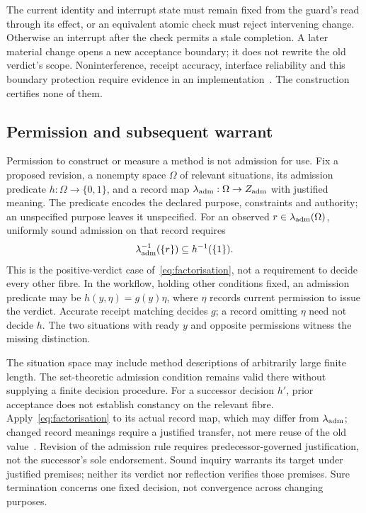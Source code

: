 \documentclass[11pt]{article}
\begin{document}
The current identity and interrupt state must remain fixed from the guard's read through its effect, or an equivalent atomic check must reject intervening change. Otherwise an interrupt after the check permits a stale completion. A later material change opens a new acceptance boundary; it does not rewrite the old verdict's scope. Noninterference, receipt accuracy, interface reliability and this boundary protection require evidence in an implementation~\cite{abadi}. The construction certifies none of them.

\subsection{Permission and subsequent warrant}\label{sec:admission}\label{par:authority}
Permission to construct or measure a method is not admission for use. Fix a proposed revision, a nonempty space $\Omega$ of relevant situations, its admission predicate $h:\Omega\to\{0,1\}$, and a record map $\lambda_{\rm adm}:\Omega\to Z_{\rm adm}$ with justified meaning. The predicate encodes the declared purpose, constraints and authority; an unspecified purpose leaves it unspecified. For an observed $r\in\lambda_{\rm adm}(\Omega)$, uniformly sound admission on that record requires
\begin{equation}\label{eq:admission}
\lambda_{\rm adm}^{-1}(\{r\})\subseteq h^{-1}(\{1\}).
\end{equation}
This is the positive-verdict case of~\eqref{eq:factorisation}, not a requirement to decide every other fibre. In the workflow, holding other conditions fixed, an admission predicate may be $h(y,\eta)=g(y)\eta$, where $\eta$ records current permission to issue the verdict. Accurate receipt matching decides $g$; a record omitting $\eta$ need not decide $h$. The two situations with ready $y$ and opposite permissions witness the missing distinction.

The situation space may include method descriptions of arbitrarily large finite length. The set-theoretic admission condition remains valid there without supplying a finite decision procedure. For a successor decision $h'$, prior acceptance does not establish constancy on the relevant fibre. Apply~\eqref{eq:factorisation} to its actual record map, which may differ from $\lambda_{\rm adm}$; changed record meanings require a justified transfer, not mere reuse of the old value~\cite{cost}. Revision of the admission rule requires predecessor-governed justification, not the successor's sole endorsement. Sound inquiry warrants its target under justified premises; neither its verdict nor reflection verifies those premises. Sure termination concerns one fixed decision, not convergence across changing purposes.
\end{document}
